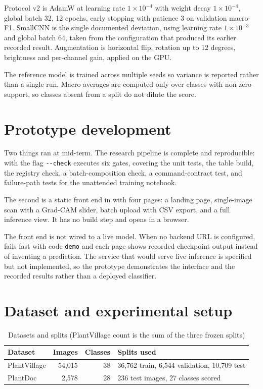\documentclass[12pt,a4paper]{report}
\newcommand{\tabfont}{\small}
\begin{document}
Protocol v2 is AdamW at learning rate $1\times10^{-4}$ with weight decay
$1\times10^{-4}$, global batch 32, 12 epochs, early stopping with patience 3 on
validation macro-F1. SmallCNN is the single documented deviation, using learning rate
$1\times10^{-3}$ and global batch 64, taken from the configuration that produced its
earlier recorded result. Augmentation is horizontal flip, rotation up to 12 degrees,
brightness and per-channel gain, applied on the GPU.

The reference model is trained across multiple seeds so variance is reported rather
than a single run. Macro averages are computed only over classes with non-zero
support, so classes absent from a split do not dilute the score.

\section{Prototype development}

Two things ran at mid-term. The research pipeline is complete and reproducible:
 with the flag \texttt{-{}-check} executes six gates, covering the unit tests, the
table build, the registry check, a batch-composition check, a command-contract test,
and failure-path tests for the unattended training notebook.

The second is a static front end in  with four pages: a landing
page, single-image scan with a Grad-CAM slider, batch upload with CSV export, and a
full inference view. It has no build step and opens in a browser.

The front end is not wired to a live model. When no backend URL is configured,
 fails fast with code \texttt{demo} and each page shows
recorded checkpoint output instead of inventing a prediction. The service that would
serve live inference is specified but not implemented, so the prototype demonstrates
the interface and the recorded results rather than a deployed classifier.

\section{Dataset and experimental setup}

\begin{table}[H]
\centering
\caption{Datasets and splits (PlantVillage count is the sum of the three frozen splits)}
\label{tab:data-mid}
\tabfont
\begin{tabularx}{\textwidth}{@{}lrrY@{}}
\toprule
\textbf{Dataset} & \textbf{Images} & \textbf{Classes} & \textbf{Splits used} \\
\midrule
PlantVillage & 54,015 & 38 & 36,762 train, 6,544 validation, 10,709 test \\
PlantDoc & 2,578 & 28 & 236 test images, 27 classes scored \\
\bottomrule
\end{tabularx}
\end{table}
\end{document}
